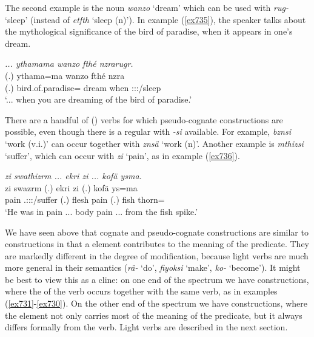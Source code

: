 The second example is the noun \emph{wanzo} `dream' which can be used with \emph{rug-} `sleep' (instead of \emph{etfth} `sleep (n)'). In example (\ref{ex735}), the speaker talks about the mythological significance of the bird of paradise, when it appears in one's dream.

\begin{exe}
	\ex \emph{... ythamama wanzo fthé nzrarugr.}\\
	\gll (.) ythama=ma wanzo fthé nzra\\
	(.) bird.of.paradise={\Char} dream when \Stsg:\Sbj:\Irr:\Ipfv/sleep\\
	\trans `... when you are dreaming of the bird of paradise.'
	\label{ex735}
\end{exe}

There are a handful of () verbs for which pseudo-cognate constructions are possible, even though there is a regular  with \emph{-si} available. For example, \emph{bznsi} `work (v.i.)' can occur together with \emph{znsä} `work (n)'. Another example is \emph{mthizsi} `suffer', which can occur with \emph{zi} `pain', as in example (\ref{ex736}).

\begin{exe}
	\ex \emph{zi swathizrm ... ekri zi ... kofä ysma.}\\
	\gll zi swazrm (.) ekri zi (.) kofä ys=ma\\
	pain \Tsg.\Masc:\Sbj:\Pst:\Dur/suffer (.) flesh pain (.) fish thorn=\Char\\
	\trans `He was in pain ... body pain ... from the fish spike.'
	\label{ex736}
\end{exe}

We have seen above that cognate and pseudo-cognate constructions are similar to  constructions in that a  element contributes to the meaning of the predicate. They are markedly different in the degree of modification, because light verbs are much more general in their semantics (\emph{rä-} `do', \emph{fiyoksi} `make', \emph{ko-} `become'). It might be best to view this as a cline: on one end of the spectrum we have  constructions, where the  of the verb occurs together with the same verb, as in examples (\ref{ex731}-\ref{ex730}). On the other end of the spectrum we have  constructions, where the  element not only carries most of the meaning of the predicate, but it always differs formally from the verb. Light verbs are described in the next section.

